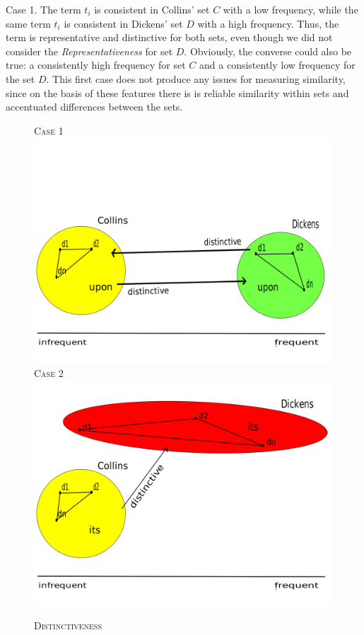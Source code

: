 \documentclass[a4paper,10pt,twoside,fleqn]{article}
\begin{document}
Case 1. The term $t_i$ is consistent in Collins' set $C$ with a low
frequency, while the same term $t_i$ is consistent in Dickens' set $D$
with a high frequency. 
Thus, the term is representative and distinctive for both sets, 
even though we did not consider the \emph{Representativeness} for set $D$. 
Obviously, the converse could also be true: a consistently high frequency 
for set $C$ and a consistently low frequency for the set $D$.
This first case does not produce any issues for measuring similarity, 
since on the basis of these features there is is reliable similarity 
within sets and accentuated differences between the sets. 


\begin{figure}
\caption{\textsc{Distinctiveness}}
{\scriptsize \textsc{Case 1}}\\
  \includegraphics[scale=0.2,width=\linewidth]{figures/distinc1-fin.png}
{\scriptsize \textsc{Case 2}}\\
  \includegraphics[scale=0.2,width=\linewidth]{figures/distinc2-fin.png}
\end{figure}
\end{document}
